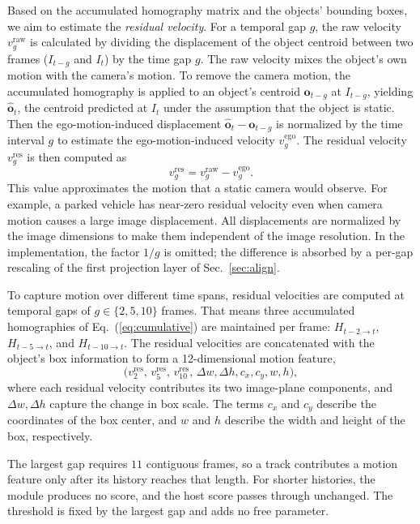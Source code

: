 \documentclass{article}
\begin{document}
Based on the accumulated homography matrix and the objects' bounding boxes, we aim to estimate the \emph{residual velocity}. For a temporal gap $g$, the raw velocity $v^{\mathrm{raw}}_{g}$ is calculated by dividing the displacement of the object centroid between two frames ($I_{t-g}$ and $I_{t}$) by the time gap $g$. The raw velocity mixes the object's own motion with the camera's motion. To remove the camera motion, the accumulated homography is applied to an object's centroid $\boldsymbol{o}_{t-g}$ at $I_{t-g}$, yielding $\hat{\boldsymbol{o}}_{t}$, the centroid predicted at $I_{t}$ under the assumption that the object is static. Then the ego-motion-induced displacement $\hat{\boldsymbol{o}}_{t}-\boldsymbol{o}_{t-g}$ is normalized by the time interval $g$ to estimate the ego-motion-induced velocity $v^{\mathrm{ego}}_{g}$. The residual velocity $v^{\mathrm{res}}_{g}$ is then computed as
\begin{equation}
  v^{\mathrm{res}}_{g} = v^{\mathrm{raw}}_{g} - v^{\mathrm{ego}}_{g}.
  \label{eq:residual}
\end{equation}
This value approximates the motion that a static camera would observe. For example, a parked vehicle has near-zero residual velocity even when camera motion causes a large image displacement. All displacements are normalized by the image dimensions to make them independent of the image resolution. In the implementation, the factor $1/g$ is omitted; the difference is absorbed by a per-gap rescaling of the first projection layer of Sec.~\ref{sec:align}.

To capture motion over different time spans, residual velocities are computed at temporal gaps of $g \in \{2,5,10\}$ frames. That means three accumulated homographies of Eq.~(\ref{eq:cumulative}) are maintained per frame: $H_{t-2 \to t}$, $H_{t-5 \to t}$, and $H_{t-10 \to t}$. The residual velocities are concatenated with the object's box information to form a 12-dimensional motion feature,
\begin{equation}
  \bigl(v^{\mathrm{res}}_{2},\,v^{\mathrm{res}}_{5},\,v^{\mathrm{res}}_{10},\,\Delta w,\Delta h,c_x,c_y,w,h\bigr),
  \label{eq:descriptor}
\end{equation}
where each residual velocity contributes its two image-plane components, and $\Delta w, \Delta h$ capture the change in box scale. The terms $c_x$ and $c_y$ describe the coordinates of the box center, and $w$ and $h$ describe the width and height of the box, respectively.

The largest gap requires $11$ contiguous frames, so a track contributes a motion feature only after its history reaches that length. For shorter histories, the module produces no score, and the host score passes through unchanged. The threshold is fixed by the largest gap and adds no free parameter.
\end{document}
